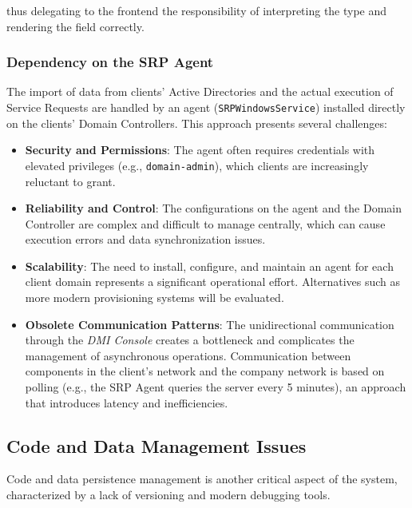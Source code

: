 thus delegating to the frontend the responsibility of interpreting the type and rendering the field correctly.

\subsubsection{Dependency on the SRP Agent}

The import of data from clients' Active Directories and the actual execution of Service Requests are handled by an agent (\texttt{SRPWindowsService}) installed directly on the clients' Domain Controllers. This approach presents several challenges:

\begin{itemize}
    \item \textbf{Security and Permissions}: The agent often requires credentials with elevated privileges (e.g., \texttt{domain-admin}), which clients are increasingly reluctant to grant.
    \item \textbf{Reliability and Control}: The configurations on the agent and the Domain Controller are complex and difficult to manage centrally, which can cause execution errors and data synchronization issues.
    \item \textbf{Scalability}: The need to install, configure, and maintain an agent for each client domain represents a significant operational effort. Alternatives such as more modern provisioning systems will be evaluated.
    \item \textbf{Obsolete Communication Patterns}: The unidirectional communication through the \textit{DMI Console} creates a bottleneck and complicates the management of asynchronous operations. Communication between components in the client's network and the company network is based on polling (e.g., the SRP Agent queries the server every 5 minutes), an approach that introduces latency and inefficiencies.
\end{itemize}

\subsection{Code and Data Management Issues}

Code and data persistence management is another critical aspect of the system, characterized by a lack of versioning and modern debugging tools.

